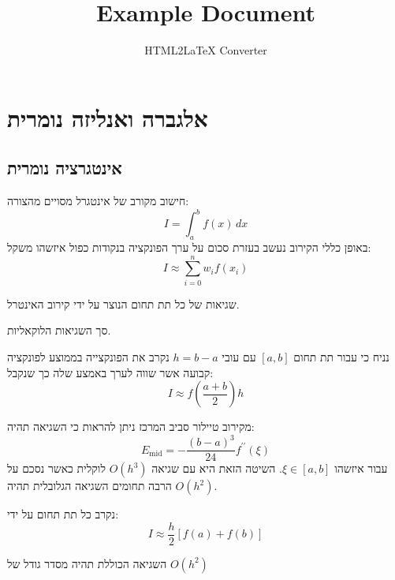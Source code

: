 \documentclass{tstextbook}
\begin{document}
\title{Example Document}
\author{HTML2LaTeX Converter}
\maketitle

\chapter{אלגברה ואנליזה נומרית}

\section{אינטגרציה נומרית}

\begin{definition}
חישוב מקורב של אינטגרל מסויים מהצורה:
$$I=\int_{a}^{b}f(x)\,d x$$
באופן כללי הקירוב נעשב בעזרת סכום על ערך הפונקציה בנקודות כפול איזשהו משקל:
$$I\approx\sum_{i=0}^{n}w_{i}f(x_{i})$$

\end{definition}
\begin{definition}
שגיאות של כל תת תחום הנוצר על ידי קירוב האינטרל.

\end{definition}
\begin{definition}
סך השגיאות הלוקאליות.

\end{definition}
\begin{definition}
נניח כי עבור תת תחום \([a,b]\) עם עובי \(h=b-a\) נקרב את הפונקצייה בממוצע לפונקציה קבועה אשר שווה לערך באמצע שלה כך שנקבל:
$$I\approx f\left({\frac{a+b}{2}}\right)h$$

\end{definition}
\begin{corollary}
מקירוב טיילור סביב המרכז ניתן להראות כי השגיאה תהיה:
$$E_{\mathrm{mid}}=-{\frac{(b-a)^{3}}{24}}f^{\prime\prime}(\xi)$$
עבור איזשהו \(\xi \in [a,b]\). השיטה הזאת היא עם שגיאה \(O(h^{3})\) לוקלית כאשר נסכם על הרבה תחומים השגיאה הגלובלית תהיה \(O(h^{2})\).

\end{corollary}
\begin{definition}
נקרב כל תת תחום על ידי:
$$I\approx\frac{h}{2}\left[f(a)+f(b)\right]$$

\end{definition}
\begin{corollary}
השגיאה הכוללת תהיה מסדר גודל של \(O(h^{2})\)

\end{corollary}
\end{document}
